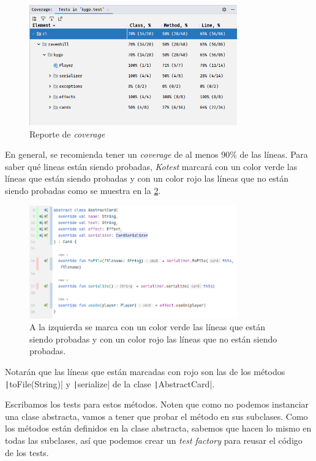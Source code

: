   \begin{figure}[ht!]
    \centering
    \includegraphics[width=0.8\textwidth]{img/oop/strategy/coverage_report.png}
    \caption{Reporte de \textit{coverage}}
    \label{fig:coverage:report}
  \end{figure}

  En general, se recomienda tener un \textit{coverage} de al menos 90\% de las líneas.
  Para saber qué lineas están siendo probadas, \textit{Kotest} marcará con un color verde las líneas
  que están siendo probadas y con un color rojo las líneas que no están siendo probadas como se
  muestra en la \cref{fig:coverage:report:lines}.

  \begin{figure}[ht!]
    \centering
    \includegraphics[width=0.8\textwidth]{img/oop/strategy/coverage_report_lines.png}
    \caption{
      A la izquierda se marca con un color verde las líneas que están siendo probadas y con un color
      rojo las líneas que no están siendo probadas.
    }
    \label{fig:coverage:report:lines}
  \end{figure}

  Notarán que las líneas que están marcadas con rojo son las de los métodos 
  \texttt|toFile(String)| y \texttt|serialize| de la clase
  \texttt|AbstractCard|.
  
  Escribamos los tests para estos métodos.
  Noten que como no podemos instanciar una clase abstracta, vamos a tener que probar el método en
  sus subclases.
  Como los métodos están definidos en la clase abstracta, sabemos que hacen lo mismo en todas las
  subclases, así que podemos crear un \textit{test factory} para reusar el código de los tests.

